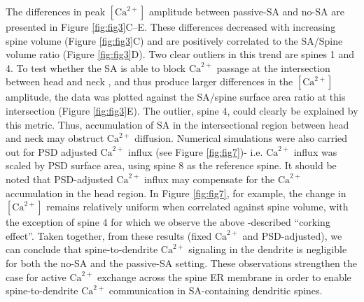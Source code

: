 \documentclass[12pt]{article}
\begin{document}
The differences in peak $[\textrm{Ca}^{2+}]$ amplitude between passive-SA and no-SA are presented in Figure \ref{fig:fig3}C–E. These differences decreased with increasing spine volume (Figure \ref{fig:fig3}C) and are positively correlated to the SA/Spine volume ratio (Figure \ref{fig:fig3}D). Two clear outliers in this trend are spines 1 and 4. To test whether the SA is able to block $\textrm{Ca}^{2+}$ passage at the intersection between head and neck \cite{Biess2011}, and thus produce larger differences in the $[\textrm{Ca}^{2+}]$ amplitude, the data was plotted against the SA/spine surface area ratio at this intersection (Figure \ref{fig:fig3}E). The outlier, spine 4, could clearly be explained by this metric. Thus, accumulation of SA in the intersectional region between head and neck may obstruct $\textrm{Ca}^{2+}$ diffusion. Numerical simulations were also carried out for PSD adjusted $\textrm{Ca}^{2+}$ influx (see Figure \ref{fig:fig7})- i.e. $\textrm{Ca}^{2+}$  influx was scaled by PSD surface area, using spine 8 as the reference spine. It should be noted that PSD-adjusted $\textrm{Ca}^{2+}$ influx may compensate for the $\textrm{Ca}^{2+}$ accumulation in the head region. In Figure \ref{fig:fig7}, for example, the change in $[\textrm{Ca}^{2+}]$ remains relatively uniform when correlated against spine volume, with the exception of spine 4 for which we observe the above -described “corking effect”. Taken together, from these results (fixed $\textrm{Ca}^{2+}$ and PSD-adjusted), we can conclude that spine-to-dendrite $\textrm{Ca}^{2+}$ signaling in the dendrite is negligible for both the no-SA and the passive-SA setting. These observations strengthen the case for active $\textrm{Ca}^{2+}$ exchange across the spine ER membrane in order to enable spine-to-dendrite $\textrm{Ca}^{2+}$ communication in SA-containing dendritic spines.
\end{document}
